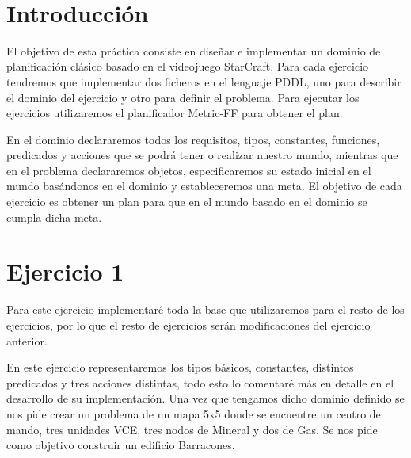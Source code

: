 \documentclass[10pt, spanish]{article}
\makeatletter
\let\thedate\@date
\makeatother
\begin{document}
\begin{titlepage}
    {\large \thedate}\\[0.5cm]
    {\doclicenseThis}
 	
    \vfill
    
\end{titlepage}




\section*{Introducción}

El objetivo de esta práctica consiste en diseñar e implementar un dominio de planificación clásico basado en el videojuego StarCraft. Para cada ejercicio tendremos que implementar dos ficheros en el lenguaje PDDL, uno para describir el dominio del ejercicio y otro para definir el problema. Para ejecutar los ejercicios utilizaremos el planificador Metric-FF para obtener el plan.

En el dominio declararemos todos los requisitos, tipos, constantes, funciones, predicados y acciones que se podrá tener o realizar nuestro mundo, mientras que en el problema declararemos objetos, especificaremos su estado inicial en el mundo basándonos en el dominio y estableceremos una meta. El objetivo de cada ejercicio es obtener un plan para que en el mundo basado en el dominio se cumpla dicha meta.

\section{Ejercicio 1}

Para este ejercicio implementaré toda la base que utilizaremos para el resto de los ejercicios, por lo que el resto de ejercicios serán modificaciones del ejercicio anterior. 

En este ejercicio representaremos los tipos básicos, constantes, distintos predicados y tres acciones distintas, todo esto lo comentaré más en detalle en el desarrollo de su implementación. Una vez que tengamos dicho dominio definido se nos pide crear un problema de un mapa 5x5 donde se encuentre un centro de mando, tres unidades VCE, tres nodos de Mineral y dos de Gas. Se nos pide como objetivo construir un edificio Barracones.
\end{document}
